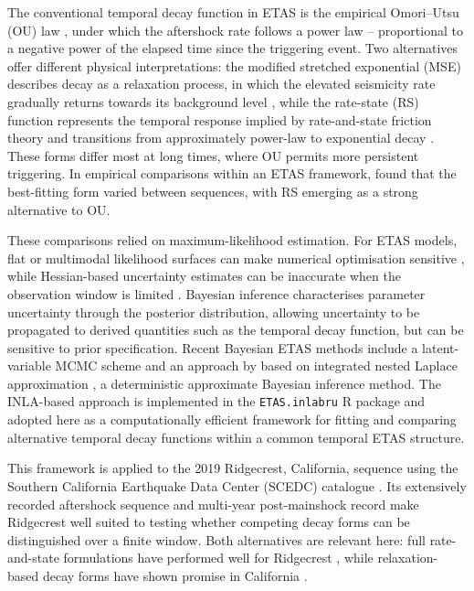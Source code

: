\documentclass{statsmsc}
\begin{document}
The conventional temporal decay function in ETAS is the empirical Omori--Utsu (OU) law \citep{omori1894aftershocks, utsu1961statistical, utsu1995centenary}, under which the aftershock rate follows a power law -- proportional to a negative power of the elapsed time since the triggering event. Two alternatives offer different physical interpretations: the modified stretched exponential (MSE) describes decay as a relaxation process, in which the elevated seismicity rate gradually returns towards its background level \citep{kisslinger1993stretched, gross1994tests}, while the rate-state (RS) function represents the temporal response implied by rate-and-state friction theory and transitions from approximately power-law to exponential decay \citep{dieterich1994constitutive, cocco2010sensitivity}. These forms differ most at long times, where OU permits more persistent triggering. In empirical comparisons within an ETAS framework, \citet{hainzl2017testing} found that the best-fitting form varied between sequences, with RS emerging as a strong alternative to OU.

These comparisons relied on maximum-likelihood estimation. For ETAS models, flat or multimodal likelihood surfaces can make numerical optimisation sensitive \citep{veen2008estimation}, while Hessian-based uncertainty estimates can be inaccurate when the observation window is limited \citep{wang2010standard}. Bayesian inference characterises parameter uncertainty through the posterior distribution, allowing uncertainty to be propagated to derived quantities such as the temporal decay function, but can be sensitive to prior specification. Recent Bayesian ETAS methods include a latent-variable MCMC scheme \citep{ross2021bayesian} and an approach by \citet{serafini2023approximation} based on integrated nested Laplace approximation \citep[INLA;][]{rue2009approximate}, a deterministic approximate Bayesian inference method. The INLA-based approach is implemented in the \texttt{ETAS.inlabru} R package \citep{naylor2023bayesian,naylor2023etas} and adopted here as a computationally efficient framework for fitting and comparing alternative temporal decay functions within a common temporal ETAS structure.

This framework is applied to the 2019 Ridgecrest, California, sequence using the Southern California Earthquake Data Center (SCEDC) catalogue \citeyearpar{scedc2013}. Its extensively recorded aftershock sequence \citep{hauksson2020ridgecrest} and multi-year post-mainshock record make Ridgecrest well suited to testing whether competing decay forms can be distinguished over a finite window. Both alternatives are relevant here: full rate-and-state formulations have performed well for Ridgecrest \citep{mancini2020predictive}, while relaxation-based decay forms have shown promise in California \citep{mignan2015modelling}.
\end{document}
